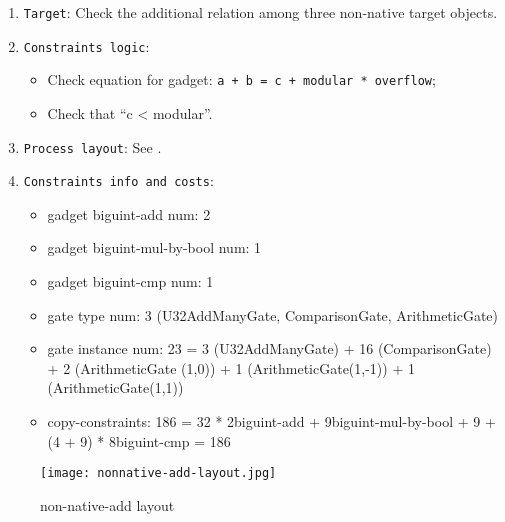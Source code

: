 
\begin{enumerate}
    \item \verb|Target|: Check the additional relation among three non-native target objects.
    \item \verb|Constraints logic|:
    \begin{itemize}
        \item Check equation for gadget: \verb|a + b = c + modular * overflow|;
        \item Check that ``c < modular''.
    \end{itemize}
    \item \verb|Process layout|: See .
    \item \verb|Constraints info and costs|:
    \begin{itemize}
        \item gadget biguint-add num: 2
        \item gadget biguint-mul-by-bool num: 1
        \item gadget biguint-cmp num: 1
        \item gate type num: 3 (U32AddManyGate, ComparisonGate, ArithmeticGate)
        \item gate instance num: 23 = 3 (U32AddManyGate) + 16 (ComparisonGate) + 2 (ArithmeticGate (1,0)) + 1 (ArithmeticGate(1,-1)) + 1 (ArithmeticGate(1,1))
        \item copy-constraints: 186 = 32 * 2{biguint-add} + 9{biguint-mul-by-bool} + 9 + (4 + 9) * 8{biguint-cmp} = 186
    \end{itemize}
\end{enumerate}

\begin{figure}[!ht]
    \centering
    \texttt{[image: nonnative-add-layout.jpg]}
    \caption{non-native-add layout}
    \label{fig:non-native-add-layout}
\end{figure}
